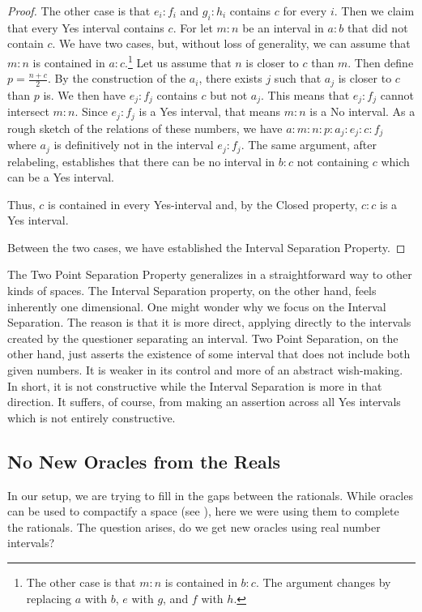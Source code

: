 \documentclass[12pt]{article}
\begin{document}
\begin{proof}
    The other case is that $e_i:f_i$ and $g_i:h_i$ contains $c$ for every $i$. Then we claim that every Yes interval contains $c$. For let $m:n$ be an interval in $a:b$ that did not contain $c$. We have two cases, but, without loss of generality, we can assume that $m:n$ is contained in $a:c$.\footnote{The other case is that $m:n$ is contained in $b:c$. The argument changes by replacing $a$ with $b$, $e$ with $g$, and $f$ with $h$.} Let us assume that $n$ is closer to $c$ than $m$. Then define $p =\frac{n+c}{2}$. By the construction of the $a_i$, there exists $j$ such that $a_j$ is closer to $c$ than $p$ is. We then have $e_j:f_j$ contains $c$ but not $a_j$. This means that $e_j:f_j$ cannot intersect $m:n$. Since $e_j:f_j$ is a Yes interval, that means $m:n$ is a No interval. As a rough sketch of the relations of these numbers, we have $a:m:n:p:a_j:e_j:c:f_j$ where $a_j$ is definitively not in the interval $e_j:f_j$. The same argument, after relabeling, establishes that there can be no interval in $b:c$ not containing $c$ which can be a Yes interval. 

    Thus, $c$ is contained in every Yes-interval and, by the Closed property, $c:c$ is a Yes interval. 

    Between the two cases, we have established the Interval Separation Property. 
\end{proof}

The Two Point Separation Property generalizes in a straightforward way to other kinds of spaces. The Interval Separation property, on the other hand, feels inherently one dimensional. One might wonder why we focus on the Interval Separation. The reason is that it is more direct, applying directly to the intervals created by the questioner separating an interval. Two Point Separation, on the other hand, just asserts the existence of some interval that does not include both given numbers. It is weaker in its control and more of an abstract wish-making. In short, it is not constructive while the Interval Separation is more in that direction. It suffers, of course, from making an assertion across all Yes intervals which is not entirely constructive. 


\subsection{No New Oracles from the Reals}

In our setup, we are trying to fill in the gaps between the rationals. While oracles can be used to compactify a space (see \cite{taylor23metric} ),  here we were using them to complete the rationals. The question arises, do we get new oracles using real number intervals? 
\end{document}
